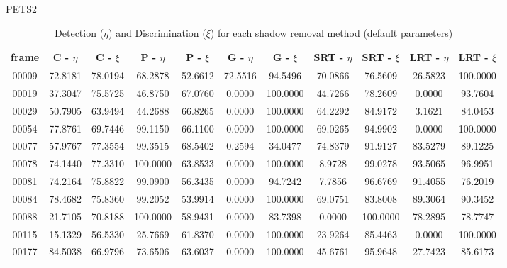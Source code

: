 \begin{appendices}
\begin{table}
\centering
\caption{PETS2}
\caption*{Detection ($\eta$) and Discrimination ($\xi$) for each shadow removal method (default parameters)}
\begin{tabular}{ |c|c|c|c|c|c|c|c|c|c|c| }
	\hline
\textbf{frame} &  \textbf{C - $\eta$} &  \textbf{C - $\xi$} &  \textbf{P - $\eta$} &  \textbf{P - $\xi$} &  \textbf{G - $\eta$} &  \textbf{G - $\xi$} &  \textbf{SRT - $\eta$} &  \textbf{SRT - $\xi$} &  \textbf{LRT - $\eta$} &  \textbf{LRT - $\xi$} \\
\hline
\hline
00009 &  72.8181 &  78.0194 &   68.2878 &  52.6612 &   72.5516 &  94.5496 &   70.0866 &  76.5609 &   26.5823 &  100.0000 \\
\hline
00019 &  37.3047 &  75.5725 &   46.8750 &  67.0760 &   0.0000 &  100.0000 &   44.7266 &  78.2609 &   0.0000 &  93.7604 \\
\hline
00029 &  50.7905 &  63.9494 &   44.2688 &  66.8265 &   0.0000 &  100.0000 &   64.2292 &  84.9172 &   3.1621 &  84.0453 \\
\hline
00054 &  77.8761 &  69.7446 &   99.1150 &  66.1100 &   0.0000 &  100.0000 &   69.0265 &  94.9902 &   0.0000 &  100.0000 \\
\hline
00077 &  57.9767 &  77.3554 &   99.3515 &  68.5402 &   0.2594 &  34.0477 &   74.8379 &  91.9127 &   83.5279 &  89.1225 \\
\hline
00078 &  74.1440 &  77.3310 &   100.0000 &  63.8533 &   0.0000 &  100.0000 &   8.9728 &  99.0278 &   93.5065 &  96.9951 \\
\hline
00081 &  74.2164 &  75.8822 &   99.0900 &  56.3435 &   0.0000 &  94.7242 &   7.7856 &  96.6769 &   91.4055 &  76.2019 \\
\hline
00084 &  78.4682 &  75.8360 &   99.2052 &  53.9914 &   0.0000 &  100.0000 &   69.0751 &  83.8008 &   89.3064 &  90.3452 \\
\hline
00088 &  21.7105 &  70.8188 &   100.0000 &  58.9431 &   0.0000 &  83.7398 &   0.0000 &  100.0000 &   78.2895 &  78.7747 \\
\hline
00115 &  15.1329 &  56.5330 &   25.7669 &  61.8370 &   0.0000 &  100.0000 &   23.9264 &  85.4463 &   0.0000 &  100.0000 \\
\hline
00177 &  84.5038 &  66.9796 &   73.6506 &  63.6037 &   0.0000 &  100.0000 &   45.6761 &  95.9648 &   27.7423 &  85.6173 \\
\hline
\end{tabular}

\end{table}


\end{appendices}
